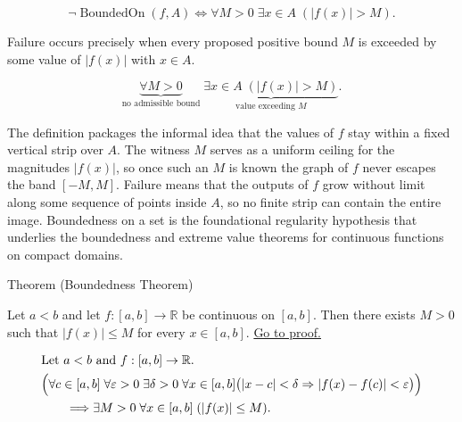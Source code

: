 \begin{remark*}
\[
\neg \operatorname{BoundedOn}(f,A) \Longleftrightarrow \forall M>0 \; \exists x \in A \; (|f(x)| > M).
\]
\end{remark*}

\begin{remark*}
Failure occurs precisely when every proposed positive bound $M$ is exceeded by some value of $|f(x)|$ with $x \in A$.
\end{remark*}

\begin{remark*}
\[
\underbrace{\forall M>0}_{\text{no admissible bound}}
\; \underbrace{\exists x \in A \; (|f(x)| > M)}_{\text{value exceeding } M}.
\]
\end{remark*}





\begin{remark*}[Interpretation]
The definition packages the informal idea that the values of $f$ stay within a fixed vertical strip over $A$. The witness $M$ serves as a uniform ceiling for the magnitudes $|f(x)|$, so once such an $M$ is known the graph of $f$ never escapes the band $[-M,M]$. Failure means that the outputs of $f$ grow without limit along some sequence of points inside $A$, so no finite strip can contain the entire image. Boundedness on a set is the foundational regularity hypothesis that underlies the boundedness and extreme value theorems for continuous functions on compact domains.
\end{remark*}

\NoLocalDependencies

\begin{theorembox}{Theorem (Boundedness Theorem)}
\begin{theorem}
\label{thm:boundedness-theorem}
Let $a<b$ and let $f:[a,b]\to\mathbb{R}$ be continuous on $[a,b]$. Then there exists $M>0$ such that $|f(x)|\le M$ for every $x\in[a,b]$.
\hyperref[prf:boundedness-theorem]{Go to proof.}
\end{theorem}
\end{theorembox}

\begin{remark*}
\[
\begin{aligned}
&\text{Let } a<b \text{ and } f:[a,b]\to\mathbb{R}.\\
&\Bigl(\forall c\in[a,b]\;\forall \varepsilon>0\;\exists \delta>0\;\forall x\in[a,b]\bigl(|x-c|<\delta \Rightarrow |f(x)-f(c)|<\varepsilon\bigr)\Bigr)\\
&\qquad\Longrightarrow \exists M>0\;\forall x\in[a,b]\;(|f(x)|\le M).
\end{aligned}
\]
\end{remark*}

